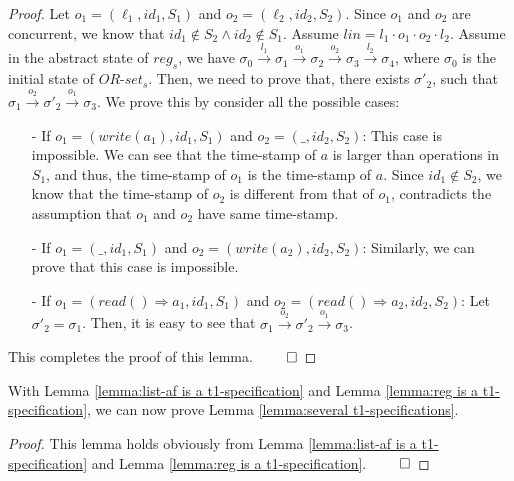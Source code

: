 {\begin {proof}
Let $o_1 = (\ell_1,\mathit{id}_1,S_1)$ and $o_2 = (\ell_2,\mathit{id}_2,S_2)$. Since $o_1$ and $o_2$ are concurrent, we know that $\mathit{id}_1 \notin S_2 \wedge \mathit{id}_2 \notin S_1$. Assume $\mathit{lin} = l_1 \cdot o_1 \cdot o_2 \cdot l_2$. Assume in the abstract state of $\mathit{reg}_s$, we have $\sigma_0 {\xrightarrow{l_1}} \sigma_1 {\xrightarrow{o_1}} \sigma_2 {\xrightarrow{o_2}} \sigma_3 {\xrightarrow{l_2}} \sigma_4$, where $\sigma_0$ is the initial state of $\mathit{OR}$-$\mathit{set}_s$. Then, we need to prove that, there exists $\sigma'_2$, such that $\sigma_1 {\xrightarrow{o_2}} \sigma'_2 {\xrightarrow{o_1}} \sigma_3$. We prove this by consider all the possible cases:


\begin{itemize}
\setlength{\itemsep}{0.5pt}
\item[-] If $o_1 = (\mathit{write}(a_1),\mathit{id}_1,S_1)$ and $o_2 = (\_,\mathit{id}_2,S_2)$: This case is impossible. We can see that the time-stamp of $a$ is larger than operations in $S_1$, and thus, the time-stamp of $o_1$ is the time-stamp of $a$. Since $\mathit{id}_1 \notin S_2$, we know that the time-stamp of $o_2$ is different from that of $o_1$, contradicts the assumption that $o_1$ and $o_2$ have same time-stamp.

\item[-] If $o_1 = (\_,\mathit{id}_1,S_1)$ and $o_2 = (\mathit{write}(a_2),\mathit{id}_2,S_2)$: Similarly, we can prove that this case is impossible.

\item[-] If $o_1 = (\mathit{read}() \Rightarrow a_1,\mathit{id}_1,S_1)$ and $o_2 = (\mathit{read}() \Rightarrow a_2,\mathit{id}_2,S_2)$: Let $\sigma'_2 = \sigma_1$. Then, it is easy to see that $\sigma_1 {\xrightarrow{o_2}} \sigma'_2 {\xrightarrow{o_1}} \sigma_3$.
\end{itemize}
This completes the proof of this lemma. $\qed$
\end {proof}


With Lemma \ref{lemma:list-af is a t1-specification} and Lemma \ref{lemma:reg is a t1-specification}, we can now prove Lemma \ref{lemma:several t1-specifications}.

\SeveralTOneSpecifications*

\begin {proof}
This lemma holds obviously from Lemma \ref{lemma:list-af is a t1-specification} and Lemma \ref{lemma:reg is a t1-specification}. $\qed$
\end {proof}









}
